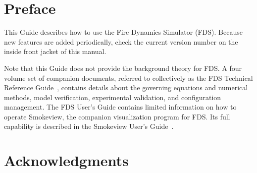 \documentclass[11pt]{book}
\begin{document}
\newpage


\frontmatter

\pagestyle{plain}




\chapter{Preface}

This Guide describes how to use the Fire Dynamics Simulator (FDS). Because new features are added periodically, check
the current version number on the inside front jacket of this manual.

Note that this Guide does not provide the background theory for FDS. A four volume set of companion documents, referred to
collectively as the FDS Technical Reference Guide~\cite{FDS_Math_Guide}, contains details about the governing
equations and numerical methods, model verification, experimental validation, and configuration management.
The FDS User's Guide contains limited information on how to operate Smokeview, the companion
visualization program for FDS. Its full capability is described in the Smokeview User's Guide~\cite{Smokeview_Users_Guide}.





\chapter{Acknowledgments}
\end{document}
